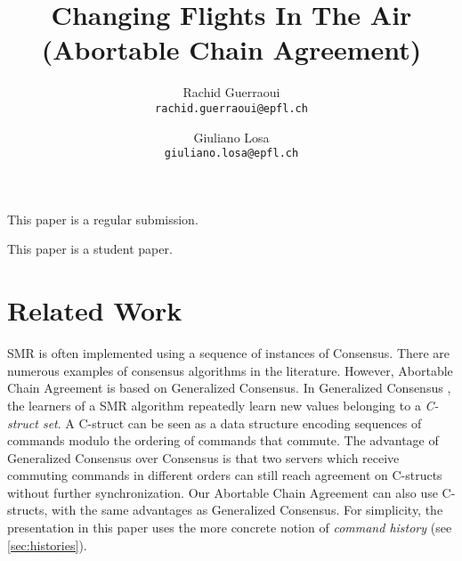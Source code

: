 




\title{Changing Flights In The Air\\ (Abortable Chain Agreement)}

\author{
  Rachid Guerraoui\\
  \texttt{rachid.guerraoui@epfl.ch}
  \and
  Giuliano Losa\\
  \texttt{giuliano.losa@epfl.ch}
}

\date{}



\maketitle



\vspace{2cm}

\begin{center}
This paper is a regular submission.

\vspace{1cm}
This paper is a student paper.
\end{center}

\newpage




\begin{comment}
Abortable Chain Agreement builds on several recent advances in SMR
algorithms: ACA allows acceptors to only eventually reach agreement,
like in Generalized Paxos \cite{Lamport05GeneralizeConsensus},
boosting performance when most commands commute; ACA allows fast
execution of read commands like in Generalized Lattice Agreement
\cite{FalerioETAL12GeneralizedLatticeAgreement}; ACA implementations
can tolerate $f$ faults with only $f+1$ replicas and replace crashed replicas
upon changing round, as in Vertical Paxos  \cite{LamportMalkhiZhou09VerticalPaxosPrimarybackupReplication}.  
\end{comment}

\section{Related Work}
\label{sec:related}

SMR is often implemented using a sequence of instances of Consensus.
There are numerous examples of consensus algorithms in the literature.
However, Abortable Chain Agreement is based on Generalized Consensus. 
In Generalized Consensus \cite{Lamport05GeneralizeConsensus}, the learners of a
SMR algorithm repeatedly learn new values belonging to a \emph{C-struct set}. A
C-struct can be seen as a data structure encoding  sequences of commands modulo
the ordering of commands that commute. The advantage of Generalized
Consensus over Consensus is that
two servers which receive commuting commands in different orders can still reach
agreement on C-structs without further synchronization. 
Our Abortable Chain Agreement can also use C-structs, with the same advantages
as Generalized Consensus. For simplicity, the presentation in this
paper uses the more concrete notion of \emph{command history} (see
\cref{sec:histories}).

